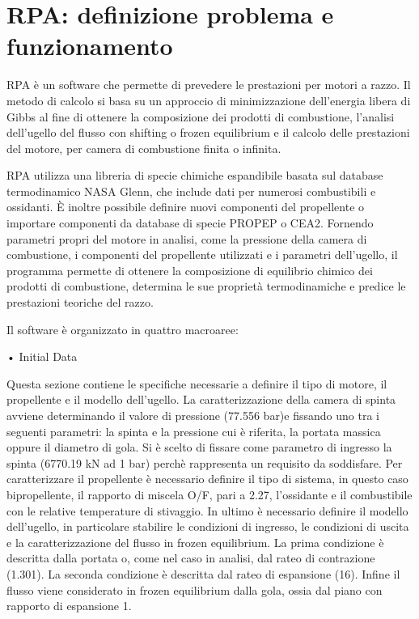 \section{RPA: definizione problema e funzionamento}
\label{appendix:rpa}
RPA è un software che permette di prevedere le prestazioni per motori a razzo. Il metodo di calcolo si basa su un approccio di minimizzazione dell'energia libera di Gibbs al fine di ottenere la composizione dei prodotti di combustione, l'analisi dell'ugello del flusso con shifting o frozen equilibrium e il calcolo delle prestazioni del motore, per camera di combustione finita o infinita.

RPA utilizza una libreria di specie chimiche espandibile basata sul database termodinamico NASA Glenn, che include dati per numerosi combustibili e ossidanti. È inoltre possibile definire nuovi componenti del propellente o importare componenti da database di specie PROPEP o CEA2.
Fornendo parametri propri del motore in analisi, come la pressione della camera di combustione, i componenti del propellente utilizzati e i parametri dell'ugello, il programma permette di ottenere la composizione di equilibrio chimico dei prodotti di combustione, determina le sue proprietà termodinamiche e predice le prestazioni teoriche del razzo. 

Il software è organizzato in quattro macroaree: 

• Initial Data

Questa sezione contiene le specifiche necessarie a definire il tipo di motore, il propellente e il modello dell'ugello.
La caratterizzazione della camera di spinta avviene determinando il valore di pressione (77.556 bar)e fissando uno tra i seguenti parametri: la spinta e la pressione cui è riferita, la portata massica oppure il diametro di gola. Si è scelto di fissare come parametro di ingresso la spinta (6770.19 kN ad 1 bar) perchè rappresenta un requisito da soddisfare.
Per caratterizzare il propellente è necessario definire il tipo di sistema, in questo caso bipropellente, il rapporto di miscela O/F, pari a 2.27, l'ossidante e il combustibile con le relative temperature di stivaggio. 
In ultimo è necessario definire il modello dell'ugello, in particolare stabilire le condizioni di ingresso, le condizioni di uscita e la caratterizzazione del flusso in frozen equilibrium. La prima condizione è descritta dalla portata o, come nel caso in analisi, dal rateo di contrazione (1.301). La seconda condizione è descritta dal rateo di espansione (16). Infine il flusso viene considerato in frozen equilibrium dalla gola, ossia dal piano con rapporto di espansione 1.

